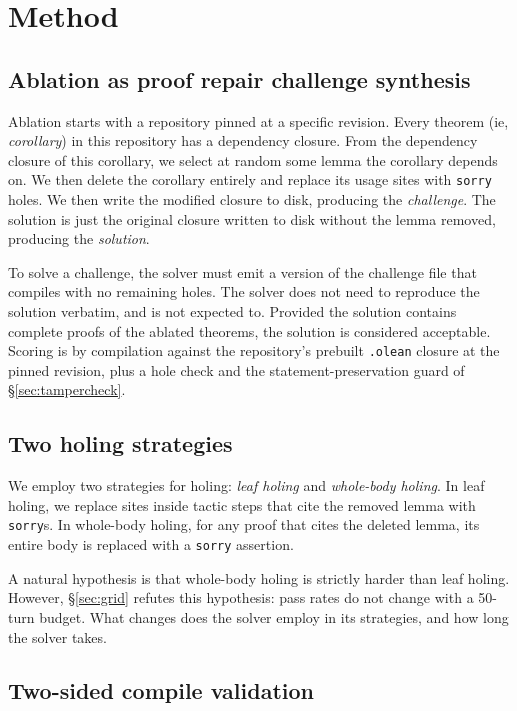 \documentclass{article}
\begin{document}
\section{Method}
\label{sec:method}


\subsection{Ablation as proof repair challenge synthesis}

Ablation starts with a repository pinned at a specific revision. Every theorem (ie, \emph{corollary}) in this repository has a dependency closure. From the dependency closure of this corollary, we select at random some lemma the corollary depends on. We then delete the corollary entirely and replace its usage sites with \texttt{sorry} holes. We then write the modified closure to disk, producing the \emph{challenge}. The solution is just the original closure written to disk without the lemma removed, producing the \emph{solution}.

To solve a challenge, the solver must emit a version of the challenge file that compiles with no remaining holes. The solver does not need to reproduce the solution verbatim, and is not expected to. Provided the solution contains complete proofs of the ablated theorems, the solution is considered acceptable. Scoring is by compilation against the repository’s prebuilt \texttt{.olean} closure at the pinned revision, plus a hole check and the statement-preservation guard of \S\ref{sec:tampercheck}.

\subsection{Two holing strategies}
\label{sec:strategies}

We employ two strategies for holing: \emph{leaf holing} and \emph{whole-body holing}. In leaf holing, we replace sites inside tactic steps that cite the removed lemma with \texttt{sorry}s. In whole-body holing, for any proof that cites the deleted lemma, its entire body is replaced with a \texttt{sorry} assertion.

A natural hypothesis is that whole-body holing is strictly harder than leaf holing. However, \S\ref{sec:grid} refutes this hypothesis: pass rates do not change with a 50-turn budget. What changes does the solver employ in its strategies, and how long the solver takes.

\subsection{Two-sided compile validation}
\label{sec:validation}
\end{document}
